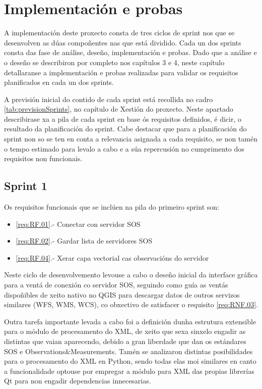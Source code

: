 \chapter{Implementación e probas}

A implementación deste proxecto consta de tres ciclos de sprint nos que se desenvolven as dúas compoñentes nas que está dividido. Cada un dos sprints consta das fase de análise, deseño, implementación e probas. Dado que a análise e o deseño se describiron por completo nos capítulos 3 e 4, neste capítulo detallaranse a implementación e probas realizadas para validar os requisitos planificados en cada un dos sprints.

A previsión inicial do contido de cada sprint está recollida no cadro \ref{tab:previsionSprints}, no capítulo de Xestión do proxecto. Neste apartado describirase xa a pila de cada sprint en base ós requisitos definidos, é dicir, o resultado da planificación do sprint. Cabe destacar que para a planificación do sprint non so se ten en conta a relevancia asignada a cada requisito, se non tamén o tempo estimado para levalo a cabo e a súa repercusión no cumprimento dos requisitos non funcionais.

\section{Sprint 1}
Os requisitos funcionais que se inclúen na pila do primeiro sprint son:
\begin{itemize}
\item \ref{req:RF.01}.- Conectar con servidor SOS
\item \ref{req:RF.02}.- Gardar lista de servidores SOS
\item \ref{req:RF.04}.- Xerar capa vectorial cas observacións do servidor
\end{itemize}

Neste ciclo de desenvolvemento levouse a cabo o deseño inicial da interface gráfica para a ventá de conexión co servidor SOS, seguindo como guía as ventás dispoñibles de xeito nativo no QGIS para descargar datos de outros servizos similares (WFS, WMS, WCS), co obxectivo de satisfacer o requisito \ref{req:RNF.03}.

Outra tarefa importante levada a cabo foi a definición dunha estrutura extensible para o módulo de procesamento do XML, de xeito que sexa sinxelo engadir as distintas que vaian aparecendo, debido a gran liberdade que dan os estándares SOS e Observations&Measurements. Tamén se analizaron distintas posibilidades para o procesamento do XML en Python, sendo todas elas moi similares en canto a funcionalidade optouse por empregar a módulo para XML das propias librerías Qt para non engadir dependencias innecesarias.

